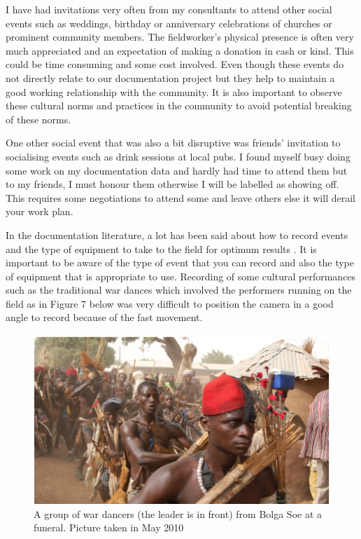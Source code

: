 \documentclass[output=paper,colorlinks,citecolor=brown]{langscibook}
\begin{document}
I have had invitations very often from my consultants to attend other social events such as weddings, birthday or anniversary celebrations of churches or prominent community members. The fieldworker’s physical presence is often very much appreciated and an expectation of making a donation in cash or kind. This could be time consuming and some cost involved. Even though these events do not directly relate to our documentation project but they help to maintain a good working relationship with the community. It is also important to observe these cultural norms and practices in the community to avoid potential breaking of these norms.  

One other social event that was also a bit disruptive was friends’ invitation to socialising events such as drink sessions at local pubs. I found myself busy doing some work on my documentation data and hardly had time to attend them but to my friends, I must honour them otherwise I will be labelled as showing off.  This requires some negotiations to attend some and leave others else it will derail your work plan.

In the documentation literature, a lot has been said about how to record events and the type of equipment to take to the field for optimum results \citep{Bowern2015, Woodbury2003, AustinGrenoble2007}.  It is important to be aware of the type of event that you can record and also the type of equipment that is appropriate to use. Recording of some cultural performances such as the traditional war dances which involved the performers running on the field as in Figure 7 below was very difficult to position the camera in a good angle to record because of the fast movement.  

\begin{figure}
\includegraphics[scale=0.55]{figures/bolga_soe.png}
\caption{A group of war dancers (the leader is in front) from Bolga Soe at a funeral. Picture taken in May 2010}
\end{figure}
\end{document}
